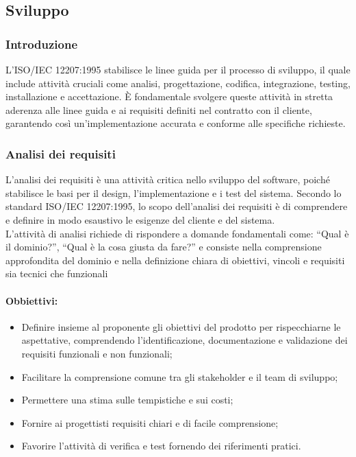 \subsection{Sviluppo}

\subsubsection{Introduzione}
L'ISO/IEC 12207:1995 stabilisce le linee guida per il processo di sviluppo, il quale include attività cruciali come analisi, progettazione, codifica, integrazione, testing, installazione e accettazione. È fondamentale svolgere queste attività in stretta aderenza alle linee guida e ai requisiti definiti nel contratto con il cliente, garantendo così un'implementazione accurata e conforme alle specifiche richieste.

\subsubsection{Analisi dei requisiti}
L'analisi dei requisiti è una attività critica nello sviluppo del software, poiché stabilisce le basi per il design, l'implementazione e i test del sistema. Secondo lo standard ISO/IEC 12207:1995, lo scopo dell'analisi dei requisiti è di comprendere e definire in modo esaustivo le esigenze del cliente e del sistema. \\
L’attività di analisi richiede di rispondere a domande fondamentali come: “Qual è il dominio?”, “Qual è la cosa giusta da fare?” e consiste nella comprensione approfondita del dominio e nella definizione chiara di obiettivi, vincoli e requisiti sia tecnici che funzionali
\paragraph{Obbiettivi:}
\begin{itemize}
    \item Definire insieme al proponente gli obiettivi del prodotto per rispecchiarne le aspettative, comprendendo l'identificazione, documentazione e validazione dei requisiti funzionali e non funzionali;
    \item Facilitare la comprensione comune tra gli stakeholder e il team di sviluppo;
    \item Permettere una stima sulle tempistiche e sui costi;
    \item Fornire ai progettisti requisiti chiari e di facile comprensione;
    \item Favorire l'attività di verifica e test fornendo dei riferimenti pratici.
\end{itemize}

